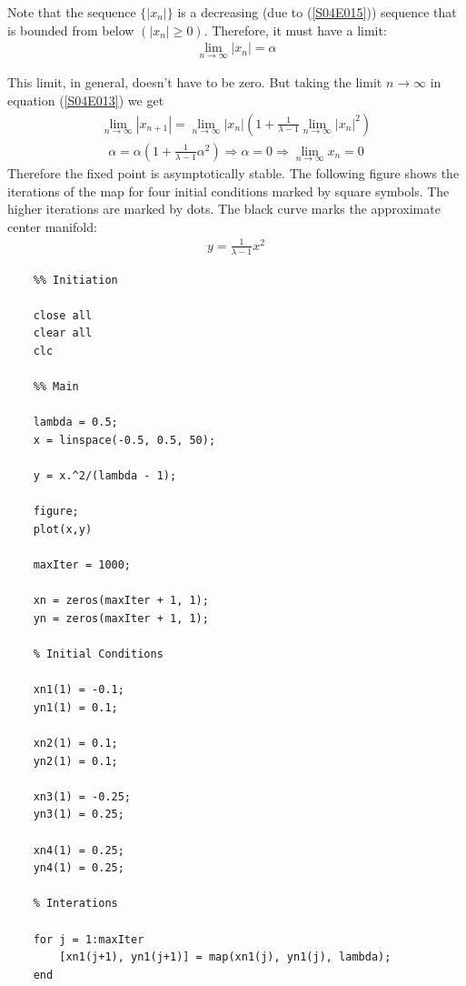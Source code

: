 \begin{solution}[4.1]
\begin{enumerate}
Note that the sequence $\{|x_n|\}$ is a decreasing (due to (\ref{S04E015})) sequence that is bounded from below $(|x_n| \geq 0)$. Therefore, it must have a limit:
\begin{align}
	\lim_{n \rightarrow \infty} |x_n| = \alpha
\end{align}

This limit, in general, doesn't have to be zero. But taking the limit $n \rightarrow \infty$ in equation (\ref{S04E013}) we get
\begin{align}
	\lim_{n \rightarrow \infty} |x_{n+1}| = \lim_{n \rightarrow \infty}
	|x_n| \left( 1 + \frac{1}{\lambda - 1} \lim_{n \rightarrow \infty} |x_n|^2 \right)
\end{align}
\begin{align}
	\alpha = \alpha \left( 1 + \frac{1}{\lambda - 1} \alpha^2 \right) \Longrightarrow \alpha = 0 \Longrightarrow \lim_{n \rightarrow \infty} x_n = 0
\end{align}
Therefore the fixed point is asymptotically stable.
\vspace{15 pt}
The following figure shows the iterations of the map for four initial conditions marked by square symbols. The higher iterations are marked by dots. The black curve marks the approximate center manifold:
\begin{align}
	y = \frac{1}{\lambda - 1}x^2
\end{align}


\begin{verbatim}
	%% Initiation

	close all
	clear all
	clc

	%% Main

	lambda = 0.5;
	x = linspace(-0.5, 0.5, 50);
	
	y = x.^2/(lambda - 1);
	
	figure;
	plot(x,y)
	
	maxIter = 1000;
	
	xn = zeros(maxIter + 1, 1);
	yn = zeros(maxIter + 1, 1);
	
	% Initial Conditions
	
	xn1(1) = -0.1;
	yn1(1) = 0.1;
	
	xn2(1) = 0.1;
	yn2(1) = 0.1;
	
	xn3(1) = -0.25;
	yn3(1) = 0.25;
	
	xn4(1) = 0.25;
	yn4(1) = 0.25;
	
	% Interations
	
	for j = 1:maxIter
	    [xn1(j+1), yn1(j+1)] = map(xn1(j), yn1(j), lambda);
	end
	

\end{verbatim}
\end{enumerate}
\end{solution}
